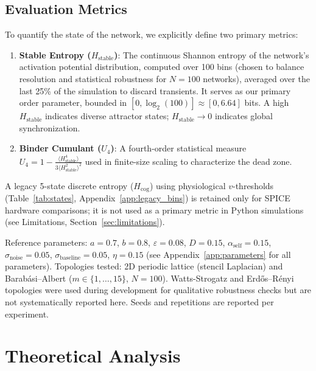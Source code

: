 ﻿\documentclass[11pt]{article}
\begin{document}
\subsection{Evaluation Metrics}
\label{sec:metrics}

To quantify the state of the network, we explicitly define two primary metrics:
\begin{enumerate}
    \item \textbf{Stable Entropy ($H_{\text{stable}}$)}: The continuous Shannon entropy of the network's activation potential distribution, computed over 100 bins (chosen to balance resolution and statistical robustness for $N=100$ networks), averaged over the last 25\% of the simulation to discard transients. It serves as our primary order parameter, bounded in $[0, \log_2(100)] \approx [0, 6.64]$ bits. A high $H_{\text{stable}}$ indicates diverse attractor states; $H_{\text{stable}} \to 0$ indicates global synchronization.
    \item \textbf{Binder Cumulant ($U_4$)}: A fourth-order statistical measure $U_4 = 1 - \frac{\langle H_{\text{stable}}^4 \rangle}{3\langle H_{\text{stable}}^2 \rangle^2}$ used in finite-size scaling to characterize the dead zone.
\end{enumerate}
A legacy 5-state discrete entropy ($H_{\text{cog}}$) using physiological $v$-thresholds (Table~\ref{tab:states}, Appendix~\ref{app:legacy_bins}) is retained only for SPICE hardware comparisons; it is not used as a primary metric in Python simulations (see Limitations, Section~\ref{sec:limitations}).

Reference parameters: $a = 0.7$, $b = 0.8$, $\varepsilon = 0.08$, $D = 0.15$, $\alpha_{\text{self}} = 0.15$, $\sigma_{\text{noise}} = 0.05$, $\sigma_{\text{baseline}} = 0.05$, $\eta = 0.15$ (see Appendix~\ref{app:parameters} for all parameters). Topologies tested: 2D periodic lattice (stencil Laplacian) and Barab\'asi--Albert ($m \in \{1, \ldots, 15\}$, $N = 100$). Watts-Strogatz and Erd\H{o}s--R\'enyi topologies were used during development for qualitative robustness checks but are not systematically reported here. Seeds and repetitions are reported per experiment.

\section{Theoretical Analysis}
\end{document}
